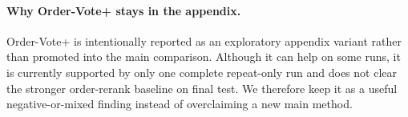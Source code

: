 \documentclass[11pt]{article}
\begin{document}
\paragraph{Why Order-Vote+ stays in the appendix.}
Order-Vote+ is intentionally reported as an exploratory appendix variant rather than promoted into the main comparison. Although it can help on some runs, it is currently supported by only one complete repeat-only run and does not clear the stronger order-rerank baseline on final test. We therefore keep it as a useful negative-or-mixed finding instead of overclaiming a new main method.
 
 
\end{document}
